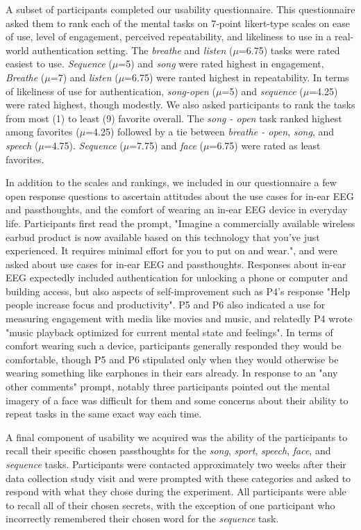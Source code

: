 \documentclass{sigchi}
\begin{document}
A subset of participants completed our usability questionnaire. This questionnaire asked them to rank each of the mental tasks on 7-point likert-type scales on ease of use, level of engagement, perceived repeatability, and likeliness to use in a real-world authentication setting. The \textit{breathe} and \textit{listen} (\(\mu\)=6.75) tasks were rated easiest to use. \textit{Sequence} (\(\mu\)=5) and \textit{song} were rated highest in engagement, \textit{Breathe} (\(\mu\)=7) and \textit{listen} (\(\mu\)=6.75) were ranted highest in repeatability. In terms of likeliness of use for authentication, \textit{song-open} (\(\mu\)=5) and \textit{sequence} (\(\mu\)=4.25) were rated highest, though modestly. We also asked participants to rank the tasks from most (1) to least (9) favorite overall. The \textit{song - open} task ranked highest among favorites (\(\mu\)=4.25) followed by a tie between \textit{breathe - open}, \textit{song}, and \textit{speech} (\(\mu\)=4.75). \textit{Sequence} (\(\mu\)=7.75) and \textit{face} (\(\mu\)=6.75) were rated as least favorites.

In addition to the scales and rankings, we included in our questionnaire a few open response questions to ascertain attitudes about the use cases for in-ear EEG and passthoughts, and the comfort of wearing an in-ear EEG device in everyday life. Participants first read the prompt, "Imagine a commercially available wireless earbud product is now available based on this technology that you've just experienced. It requires minimal effort for you to put on and wear.", and were asked about use cases for in-ear EEG and passthoughts. Responses about in-ear EEG expectedly included authentication for unlocking a phone or computer and building access, but also aspects of self-improvement such as P4's response "Help people increase focus and productivity". P5 and P6 also indicated a use for measuring engagement with media like movies and music, and relatedly P4 wrote "music playback optimized for current mental state and feelings". In terms of comfort wearing such a device, participants generally responded they would be comfortable, though P5 and P6 stipulated only when they would otherwise be wearing something like earphones in their ears already. In response to an "any other comments" prompt, notably three participants pointed out the mental imagery of a face was difficult for them and some concerns about their ability to repeat tasks in the same exact way each time.

A final component of usability we acquired was the ability of the participants to recall their specific chosen passthoughts for the \textit{song}, \textit{sport}, \textit{speech}, \textit{face}, and \textit{sequence} tasks. Participants were contacted approximately two weeks after their data collection study visit and were prompted with these categories and asked to respond with what they chose during the experiment. All participants were able to recall all of their chosen secrets, with the exception of one participant who incorrectly remembered their chosen word for the \textit{sequence} task. 
\end{document}
